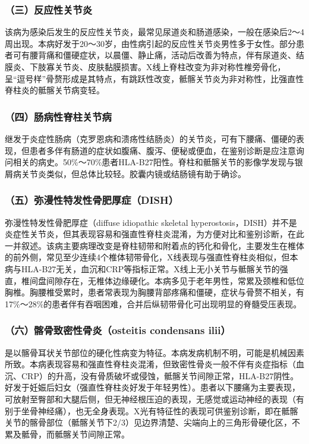 \subsubsection{（三）反应性关节炎}

该病为感染后发生的反应性关节炎，最常见尿道炎和肠道感染，一般在感染后2～4周出现。本病好发于20～30岁，由性病引起的反应性关节炎男性多于女性。部分患者可有腰背痛和僵硬症状，以晨僵、静止痛，活动后改善为特点，伴有尿道炎、结膜炎、下肢寡关节炎、皮肤黏膜损害。X线上脊柱改变为非对称性椎旁骨化，呈“逗号样”骨赘形成是其特点，有跳跃性改变，骶髂关节炎为非对称性，比强直性脊柱炎的骶髂关节病变轻。

\subsubsection{（四）肠病性脊柱关节病}

继发于炎症性肠病（克罗恩病和溃疡性结肠炎）的关节炎，可有下腰痛、僵硬的表现，但患者多伴有肠道的症状如腹痛、腹泻、便秘或便血，在鉴别诊断是应注意询问相关的病史。50\%～70\%患者HLA-B27阳性。脊柱和骶髂关节的影像学发现与银屑病关节炎类似，但总体比较轻。胶囊内镜或结肠镜有助于确诊。

\subsubsection{（五）弥漫性特发性骨肥厚症（DISH）}

弥漫性特发性骨肥厚症（diffuse idiopathic skeletal
hyperostosis，DISH）并不是炎症性关节炎，但其表现容易和强直性脊柱炎混淆，为方便对比和鉴别诊断，在此一并叙述。该病主要病理改变是脊柱韧带和附着点的钙化和骨化，主要发生在椎体的前外侧，常见至少连续4个椎体韧带骨化，X线表现与强直性脊柱炎相似，但本病与HLA-B27无关，血沉和CRP等指标正常。X线上无小关节与骶髂关节的强直，椎间盘间隙存在，无椎体边缘硬化。本病多见于老年男性，常累及颈椎和低位胸椎。胸腰椎受累时，患者常表现为胸腰背部疼痛和僵硬，症状与骨赘不相关，有17\%～28\%的患者伴有吞咽困难，合并后纵韧带骨化可出现明显的脊髓受压表现。

\subsubsection{（六）髂骨致密性骨炎（osteitis condensans ilii）}

是以髂骨耳状关节部位的硬化性病变为特征。本病发病机制不明，可能是机械因素所致。本病表现容易和强直性脊柱炎混淆，但致密性骨炎一般不伴有炎症指标（血沉、CRP）的升高，没有骨质破坏或侵蚀，骶髂关节间隙正常，HLA-B27阴性。好发于妊娠后妇女（强直性脊柱炎好发于年轻男性）。患者以下腰痛为主要表现，可放射至臀部和大腿后侧，但无神经根压迫的表现，无感觉或运动神经的表现（有别于坐骨神经痛），也无全身表现。X光有特征性的表现可供鉴别诊断，即在骶髂关节的髂骨部位（骶髂关节下2/3）见边界清楚、尖端向上的三角形骨硬化区，不累及骶骨，而骶髂关节间隙正常。

